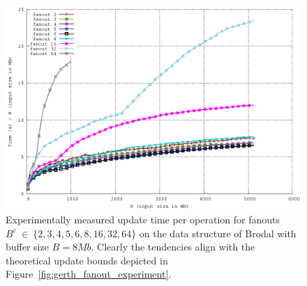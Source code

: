 \documentclass[twoside,11pt,openright]{report}
\def \epsilon {\varepsilon}
\begin{document}
\begin{figure}[h]
\begin{minipage}[t]{0.48\columnwidth}
  \label{fig:gerth_fanout_experiment_zoom}
\end{minipage}
\centering
\includegraphics[width=\textwidth]{../src/experiments/gerth_fanout_experiment_results/2016-05-06.11_52_24/time}
\caption{Experimentally measured update time per operation for fanouts $B^\epsilon~\in~\{2,3,4,5,6,8,16,32,64\}$ on the data structure of Brodal with buffer size $B = 8 Mb$. Clearly the tendencies align with the theoretical update bounds depicted in Figure~\ref{fig:gerth_fanout_experiment}.}
\label{fig:gerth_fanout_experiment_time}
\end{figure}
\end{document}

